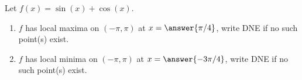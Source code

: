 \documentclass{ximera}
\author{Gregory Hartman \and Matthew Carr}
\begin{document}
\begin{exercise}






Let $f(x)=\sin(x)+\cos(x)$.
\begin{enumerate}
\item		$f$ has local maxima on $(-\pi,\pi)$ at $x=\answer{\pi/4}$, write DNE if no such point(s) exist.
\item		$f$ has local minima on $(-\pi,\pi)$ at $x=\answer{-3\pi/4}$, write DNE if no such point(s) exist.
\end{enumerate}

\end{exercise}
\end{document}
